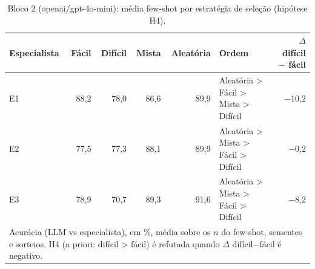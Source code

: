 \begin{table}[htbp]
\centering
\small
\caption{Bloco 2 (openai/gpt-4o-mini): média few-shot por estratégia de seleção (hipótese H4).}
\label{tab:bloco2_E_H4_media_fewshot_por_estrategia_gpt4mini}
\begin{tabular}{lrrrrlr}
\toprule
Especialista & Fácil & Difícil & Mista & Aleatória & Ordem & $\Delta$ difícil $-$ fácil \\
\midrule
E1 & 88,2 & 78,0 & 86,6 & 89,9 & Aleatória > Fácil > Mista > Difícil & $-$10,2 \\
E2 & 77,5 & 77,3 & 88,1 & 89,9 & Aleatória > Mista > Fácil > Difícil & $-$0,2 \\
E3 & 78,9 & 70,7 & 89,3 & 91,6 & Aleatória > Mista > Fácil > Difícil & $-$8,2 \\
\bottomrule
\multicolumn{7}{p{0.95\linewidth}}{\footnotesize Acurácia (LLM vs especialista), em \%, média sobre os $n$ do few-shot, sementes e sorteios. H4 (a priori: difícil > fácil) é refutada quando $\Delta$ difícil$-$fácil é negativo.} \\
\end{tabular}
\end{table}
